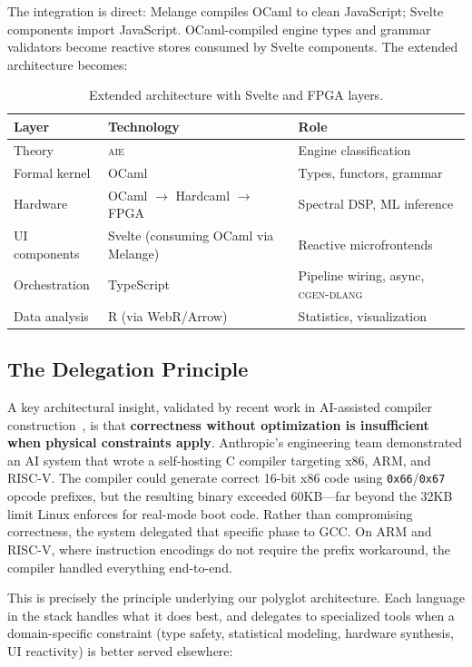 \documentclass[11pt,letterpaper]{article}
\newcommand{\aie}{\textsc{aie}}
\newcommand{\cgen}{\textsc{cgen-dlang}}
\begin{document}
The integration is direct: Melange compiles OCaml to clean JavaScript; Svelte components import JavaScript. OCaml-compiled engine types and grammar validators become reactive stores consumed by Svelte components. The extended architecture becomes:

\begin{table}[H]
\centering
\begin{tabularx}{\textwidth}{lXl}
\toprule
\textbf{Layer} & \textbf{Technology} & \textbf{Role} \\
\midrule
Theory & \aie{} & Engine classification \\
Formal kernel & OCaml & Types, functors, grammar \\
Hardware & OCaml $\rightarrow$ Hardcaml $\rightarrow$ FPGA & Spectral DSP, ML inference \\
UI components & Svelte (consuming OCaml via Melange) & Reactive microfrontends \\
Orchestration & TypeScript & Pipeline wiring, async, \cgen{} \\
Data analysis & R (via WebR/Arrow) & Statistics, visualization \\
\bottomrule
\end{tabularx}
\caption{Extended architecture with Svelte and FPGA layers.}
\label{tab:extended-arch}
\end{table}

\subsection{The Delegation Principle}

A key architectural insight, validated by recent work in AI-assisted compiler construction~\cite{anthropic2025}, is that \textbf{correctness without optimization is insufficient when physical constraints apply}. Anthropic's engineering team demonstrated an AI system that wrote a self-hosting C compiler targeting x86, ARM, and RISC-V. The compiler could generate correct 16-bit x86 code using \texttt{0x66}/\texttt{0x67} opcode prefixes, but the resulting binary exceeded 60KB---far beyond the 32KB limit Linux enforces for real-mode boot code. Rather than compromising correctness, the system delegated that specific phase to GCC. On ARM and RISC-V, where instruction encodings do not require the prefix workaround, the compiler handled everything end-to-end.

This is precisely the principle underlying our polyglot architecture. Each language in the stack handles what it does best, and delegates to specialized tools when a domain-specific constraint (type safety, statistical modeling, hardware synthesis, UI reactivity) is better served elsewhere:
\end{document}
